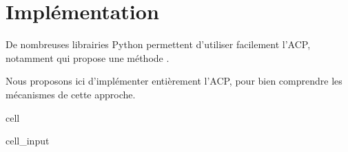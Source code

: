 \documentclass[letterpaper,10pt,english]{jupyterBook}
\begin{document}
\section{Implémentation}
\label{\detokenize{acp:implementation}}
\sphinxAtStartPar
De nombreuses librairies Python permettent d’utiliser facilement l’ACP, notamment  qui propose une méthode .

\sphinxAtStartPar
Nous proposons ici d’implémenter entièrement l’ACP, pour bien comprendre les mécanismes de cette approche.

\begin{sphinxuseclass}{cell}\begin{sphinxVerbatimInput}

\begin{sphinxuseclass}{cell_input}
\begin{sphinxVerbatim}[commandchars=\\\{\}]
   
   
    

  


\end{sphinxVerbatim}
\end{sphinxuseclass}
\end{sphinxVerbatimInput}
\end{sphinxuseclass}
\end{document}
